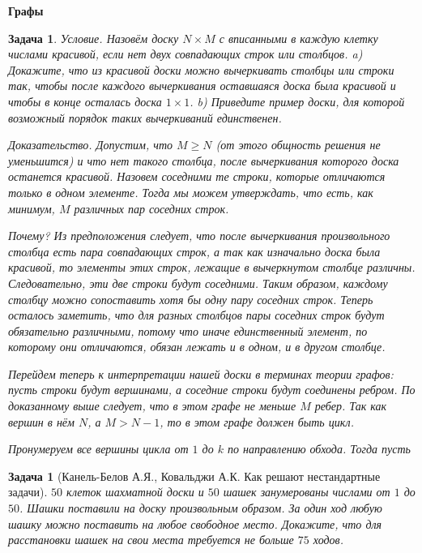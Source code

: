 \documentclass[12pt,a4paper,fleqn]{article}
\newtheorem{task}{Задача}
\newtheorem{exersize}{Задача}
\begin{document}
\begin{center}
	\bf \Large Графы
\end{center}
\begin{task}
	\emph{Условие.} Назовём доску $N \times M$ с вписанными в каждую клетку числами \textit{красивой}, если нет двух совпадающих строк или столбцов. a) Докажите, что из красивой доски можно вычеркивать столбцы или строки так, чтобы после каждого вычеркивания оставшаяся доска была красивой и чтобы в конце осталась доска $1 \times 1$. b) Приведите пример доски, для которой возможный порядок таких вычеркиваний единственен.
	
	\emph{Доказательство.} Допустим, что $M \geqslant N$ (от этого общность решения не уменьшится) и что нет такого столбца, после вычеркивания которого доска останется красивой. Назовем \textit{соседними} те строки, которые отличаются только в одном элементе. Тогда мы можем утверждать, что есть, как минимум, $M$ различных пар соседних строк.
	
	Почему? Из предположения следует, что после вычеркивания произвольного столбца есть пара совпадающих строк, а так как изначально доска была красивой, то элементы этих строк, лежащие в вычеркнутом столбце различны. Следовательно, эти две строки будут соседними. Таким образом, каждому столбцу можно сопоставить хотя бы одну пару соседних строк. Теперь осталось заметить, что для разных столбцов пары соседних строк будут обязательно различными, потому что иначе единственный элемент, по которому они отличаются, обязан лежать и в одном, и в другом столбце.
	
	Перейдем теперь к интерпретации нашей доски в терминах теории графов: пусть строки будут вершинами, а соседние строки будут соединены ребром. По доказанному выше следует, что в этом графе не меньше $M$ ребер. Так как вершин в нём $N$, а $M > N - 1$, то в этом графе должен быть цикл. 
	
	Пронумеруем все вершины цикла от $1$ до $k$ по направлению обхода. Тогда пусть 
\end{task}

\begin{exersize}[Канель-Белов А.Я., Ковальджи А.К. Как решают нестандартные задачи]
	$50$ клеток шахматной доски и $50$ шашек занумерованы числами от $1$ до $50$. Шашки поставили на доску произвольным образом. За один ход любую шашку можно поставить на любое свободное место. Докажите, что для расстановки шашек на свои места требуется не больше $75$ ходов.
\end{exersize}
\end{document}
